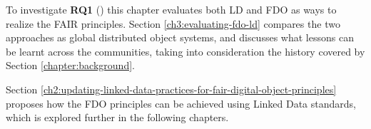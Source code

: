 
To investigate \textbf{RQ1} () this chapter evaluates both 
\acrlong{LD}
and 
\acrfull{FDO}
as ways to realize the FAIR principles. Section \ref{ch3:evaluating-fdo-ld} compares the two approaches as global distributed object systems, and discusses what lessons can be learnt across the communities, taking into consideration the history covered by Section \ref{chapter:background}.

Section \ref{ch2:updating-linked-data-practices-for-fair-digital-object-principles} proposes how the FDO principles can be achieved using Linked Data standards, which is explored further in the following chapters.
